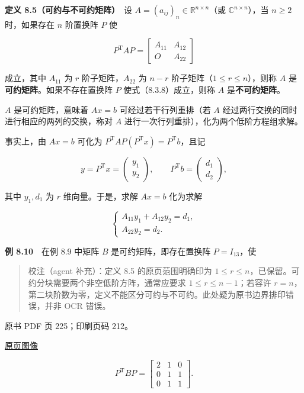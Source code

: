 \textbf{定义 8.5（可约与不可约矩阵）}　设 \(A=(a_{ij})_n\in\mathbb R^{n\times n}\)（或 \(\mathbb C^{n\times n}\)），当 \(n\geqslant2\) 时，如果存在 \(n\) 阶置换阵 \(P\) 使

\[
P^{\mathrm T}AP=\begin{bmatrix}A_{11}&A_{12}\\O&A_{22}\end{bmatrix}
\tag{8.3.8}
\]

成立，其中 \(A_{11}\) 为 \(r\) 阶子矩阵，\(A_{22}\) 为 \(n-r\) 阶子矩阵（\(1\leqslant r\leqslant n\)），则称 \(A\) 是\textbf{可约矩阵}。如果不存在置换阵 \(P\) 使式（8.3.8）成立，则称 \(A\) 是\textbf{不可约矩阵}。

\(A\) 是可约矩阵，意味着 \(Ax=b\) 可经过若干行列重排（若 \(A\) 经过两行交换的同时进行相应的两列的交换，称对 \(A\) 进行一次行列重排），化为两个低阶方程组求解。

事实上，由 \(Ax=b\) 可化为 \(P^{\mathrm T}AP(P^{\mathrm T}x)=P^{\mathrm T}b\)，且记

\[
y=P^{\mathrm T}x=\begin{pmatrix}y_1\\y_2\end{pmatrix},\qquad
P^{\mathrm T}b=\begin{pmatrix}d_1\\d_2\end{pmatrix},
\]

其中 \(y_1,d_1\) 为 \(r\) 维向量。于是，求解 \(Ax=b\) 化为求解

\[
\begin{cases}
A_{11}y_1+A_{12}y_2=d_1,\\
A_{22}y_2=d_2.
\end{cases}
\]

\textbf{例 8.10}　在例 8.9 中矩阵 \(B\) 是可约矩阵，即存在置换阵 \(P=I_{13}\)，使

\begin{quote}
校注（agent 补充）：定义 8.5 的原页范围明确印为 \(1\leqslant r\leqslant n\)，已保留。可约分块需要两个非空低阶方阵，通常应要求 \(1\leqslant r\leqslant n-1\)；若容许 \(r=n\)，第二块阶数为零，定义不能区分可约与不可约。此处疑为原书边界排印错误，并非 OCR 错误。
\end{quote}

\clearpage

原书 PDF 页 225；印刷页码 212。

\href{source-images/pdf-225.jpeg}{原页图像}

\[
P^{\mathrm T}BP=\left[\begin{array}{c|cc}2&1&0\\\hline0&1&1\\0&1&1\end{array}\right].
\]

